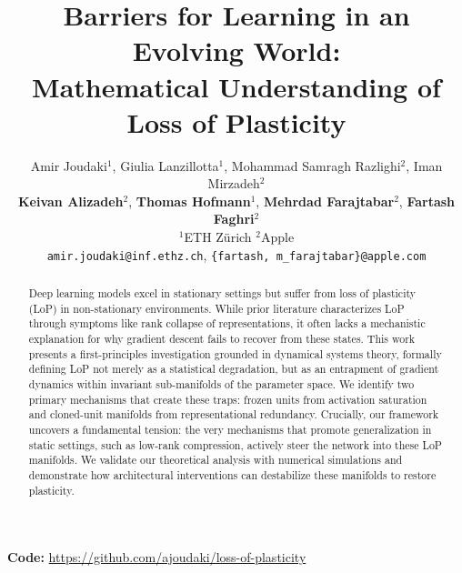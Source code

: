 \documentclass{article}
\title{Barriers for Learning in an Evolving World: \\Mathematical Understanding of Loss of Plasticity}
\author{Amir Joudaki$^{1}$,
 Giulia Lanzillotta$^{1}$,
 Mohammad Samragh Razlighi$^{2}$,
 Iman Mirzadeh$^{2}$\\
 \textbf{Keivan Alizadeh}$^{2}$,
 \textbf{Thomas Hofmann}$^{1}$,
 \textbf{Mehrdad Farajtabar}$^{2}$,
 \textbf{Fartash Faghri}$^{2}$\\
 $^{1}$ETH Zürich \quad
 $^{2}$Apple \\
 \texttt{amir.joudaki@inf.ethz.ch},
 \texttt{\{fartash, m\_farajtabar\}@apple.com}
}
\numberwithin{figure}{section}
\begin{document}
\maketitle








\begin{abstract}
    Deep learning models excel in stationary settings but suffer from loss of plasticity (LoP) in non-stationary environments. While prior literature characterizes LoP through symptoms like rank collapse of representations, it often lacks a mechanistic explanation for why gradient descent fails to recover from these states. This work presents a first-principles investigation grounded in dynamical systems theory, formally defining LoP not merely as a statistical degradation, but as an entrapment of gradient dynamics within invariant sub-manifolds of the parameter space. We identify two primary mechanisms that create these traps: frozen units from activation saturation and cloned-unit manifolds from representational redundancy. Crucially, our framework uncovers a fundamental tension: the very mechanisms that promote generalization in static settings, such as low-rank compression, actively steer the network into these LoP manifolds. We validate our theoretical analysis with numerical simulations and demonstrate how architectural interventions can destabilize these manifolds to restore plasticity.\\
    
\end{abstract}
\vspace{-0.6cm}
\noindent\textbf{Code:} \url{https://github.com/ajoudaki/loss-of-plasticity}
\vspace{-0.3cm}
\end{document}
